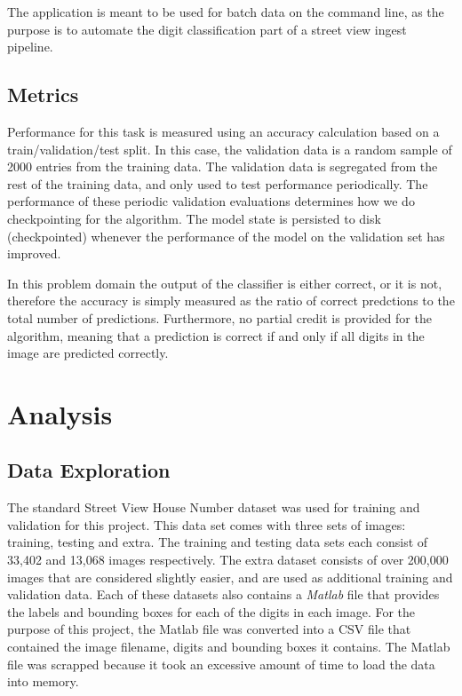 \documentclass[12pt]{article}
\begin{document}
The application is meant to be used for batch data on the command line, as the purpose is to automate the digit classification part of a street view ingest pipeline.

\subsection{Metrics}
Performance for this task is measured using an accuracy calculation based on a train/validation/test split.
In this case, the validation data is a random sample of 2000 entries from the training data.
The validation data is segregated from the rest of the training data, and only used to test performance periodically.
The performance of these periodic validation evaluations determines how we do checkpointing for the algorithm.
The model state is persisted to disk (checkpointed) whenever the performance of the model on the validation set has improved.

In this problem domain the output of the classifier is either correct, or it is not, therefore the accuracy is simply measured as the ratio of correct predctions to the total number of predictions.
Furthermore, no partial credit is provided for the algorithm, meaning that a prediction is correct if and only if all digits in the image are predicted correctly.

\section{Analysis}
\subsection{Data Exploration} \label{sssec:data_exploration}
The standard Street View House Number dataset\cite{svhn_dataset} was used for training and validation for this project. 
This data set comes with three sets of images: training, testing and extra. 
The training and testing data sets each consist of 33,402 and 13,068 images respectively. 
The extra dataset consists of over 200,000 images that are considered slightly easier, and are used as additional training and validation data. 
Each of these datasets also contains a \textit{Matlab} file that provides the labels and bounding boxes for each of the digits in each image.
For the purpose of this project, the Matlab file was converted into a CSV file that contained the image filename, digits and bounding boxes it contains. 
The Matlab file was scrapped because it took an excessive amount of time to load the data into memory. 
\end{document}
